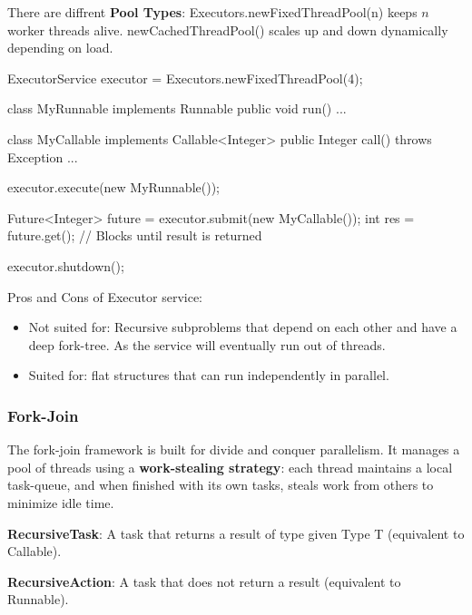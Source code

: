 \begin{remark}
    There are diffrent \textbf{Pool Types}: Executors.newFixedThreadPool(n) keeps $n$ worker threads alive. newCachedThreadPool() scales up and down dynamically depending on load.
\end{remark}

\begin{codeexample}
ExecutorService executor = Executors.newFixedThreadPool(4);

class MyRunnable implements Runnable {
    public void run() {...}
}

class MyCallable implements Callable<Integer> {
    public Integer call() throws Exception {...}
}   

executor.execute(new MyRunnable());

Future<Integer> future = executor.submit(new MyCallable());
int res = future.get(); // Blocks until result is returned

executor.shutdown();
\end{codeexample}

Pros and Cons of Executor service:
\begin{itemize}
    \item Not suited for: Recursive subproblems that depend on each other and have a deep fork-tree. As the service will eventually run out of threads.
    \item Suited for: flat structures that can run independently in parallel.
\end{itemize}

\subsubsection{Fork-Join}

The fork-join framework is built for divide and conquer parallelism. It manages a pool of threads using a \textbf{work-stealing strategy}: each thread maintains a local task-queue, and when finished with its own tasks, steals work from others to minimize idle time.

\begin{definition}
    \textbf{RecursiveTask}: A task that returns a result of type given Type T (equivalent to Callable).
\end{definition}

\begin{definition}
    \textbf{RecursiveAction}: A task that does not return a result (equivalent to Runnable).
\end{definition}

